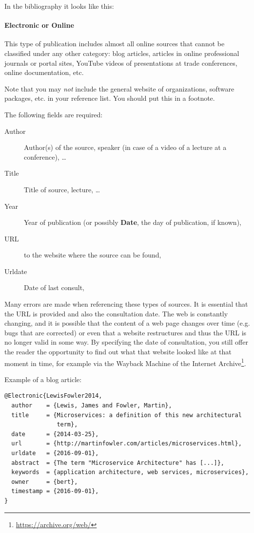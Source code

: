 In the bibliography it looks like this: 


\paragraph{Electronic or Online}

This type of publication includes almost all online sources that cannot be classified under any other category: blog articles, articles in online professional journals or portal sites, YouTube videos of presentations at trade conferences, online documentation, etc.

Note that you may \emph{not} include the general website of organizations, software packages, etc. in your reference list. You should put this in a footnote.

The following fields are required:

\begin{description}
    \item[Author] Author(s) of the source, speaker (in case of a video of a lecture at a conference), \ldots
    \item[Title] Title of source, lecture, \ldots
    \item[Year] Year of publication (or possibly \textbf{Date}, the day of publication, if known),
    \item[URL] to the website where the source can be found,
    \item[Urldate] Date of last consult,
\end{description}

Many errors are made when referencing these types of sources. It is essential that the URL is provided and also the consultation date. The web is constantly changing, and it is possible that the content of a web page changes over time (e.g. bugs that are corrected) or even that a website restructures and thus the URL is no longer valid in some way. By specifying the date of consultation, you still offer the reader the opportunity to find out what that website looked like at that moment in time, for example via the Wayback Machine of the Internet Archive\footnote{\url{https://archive.org/web/}}.

Example of a blog article:

\begin{verbatim}
@Electronic{LewisFowler2014,
  author    = {Lewis, James and Fowler, Martin},
  title     = {Microservices: a definition of this new architectural
               term},
  date      = {2014-03-25},
  url       = {http://martinfowler.com/articles/microservices.html},
  urldate   = {2016-09-01},
  abstract  = {The term "Microservice Architecture" has [...]},
  keywords  = {application architecture, web services, microservices},
  owner     = {bert},
  timestamp = {2016-09-01},
}
\end{verbatim}

